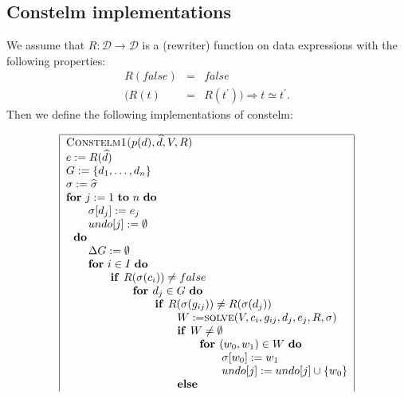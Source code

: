 \documentclass{article}
\begin{document}
\subsection{Constelm implementations}

We assume that $R:\mathcal{D\rightarrow D}$ is a (rewriter) function on data
expressions with the following properties:%
\begin{eqnarray*}
R(false) &=&false \\
(R(t) &=&R(t^{\prime }))\Rightarrow t\simeq t^{\prime }\text{.}
\end{eqnarray*}%
Then we define the following implementations of constelm:

\[
\begin{tabular}{|l|}
\hline
\textsc{Constelm1(}$p(d),\widehat{d},V,R$\textsc{)} \\ 
$e:=R(\widehat{d})$ \\ 
$G:=\{d_{1},\ldots ,d_{n}\}$ \\ 
$\sigma :=\widehat{\sigma }$ \\ 
\textbf{for} $j:=1$ \textbf{to} $n$ \textbf{do} \\ 
$\qquad \sigma \lbrack d_{j}]:=e_{j}$ \\ 
$\qquad undo[j]:=\emptyset $ \\ 
$\text{\textbf{do}}$ \\ 
$\qquad \Delta G:=\emptyset $ \\ 
$\qquad $\textbf{for} $i\in I$ \textbf{do} \\ 
$\qquad \qquad $\textbf{if }$R(\sigma (c_{i}))\neq false$ \\ 
$\qquad \qquad \qquad $\textbf{for }$d_{j}\in G$ \textbf{do} \\ 
$\qquad \qquad \qquad \qquad $\textbf{if }$R(\sigma (g_{ij}))\neq R(\sigma
(d_{j}))$ \\ 
$\qquad \qquad \qquad \qquad \qquad W:=$\textsc{solve}$%
(V,c_{i},g_{ij},d_{j},e_{j},R,\sigma )$ \\ 
$\qquad \qquad \qquad \qquad \qquad $\textbf{if }$W\neq \emptyset $ \\ 
$\qquad \qquad \qquad \qquad \qquad \qquad $\textbf{for }$(w_{0},w_{1})\in W$
\textbf{do} \\ 
$\qquad \qquad \qquad \qquad \qquad \qquad \qquad \sigma \lbrack
w_{0}]:=w_{1}$ \\ 
$\qquad \qquad \qquad \qquad \qquad \qquad \qquad undo[j]:=undo[j]\cup
\{w_{0}\}$ \\ 
$\qquad \qquad \qquad \qquad \qquad $\textbf{else} \\ 

\end{tabular}\]
\end{document}
